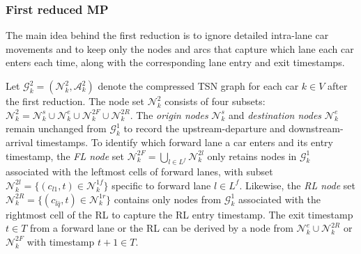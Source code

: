 \documentclass[12pt]{article}
\begin{document}
\subsubsection{First reduced MP}
The main idea behind the first reduction is to ignore detailed intra-lane car movements and to keep only the nodes and arcs that capture which lane each car enters each time, along with the corresponding lane entry and exit timestamps.

Let $\mathcal{G}^2_k=(\mathcal{N}^2_k,\mathcal{A}^2_k)$ denote the compressed TSN graph for each car $k\in V$ after the first reduction. The node set $\mathcal{N}^2_k$ consists of four subsets: $\mathcal{N}^2_k=\mathcal{N}^s_k\cup \mathcal{N}^e_k\cup \mathcal{N}^{2F}_k\cup \mathcal{N}^{2R}_k$. The \textit{origin nodes} $\mathcal{N}^s_k$ and \textit{destination nodes} $\mathcal{N}^e_k$ remain unchanged from $\mathcal{G}^1_k$ to record the upstream-departure and downstream-arrival timestamps. To identify which forward lane a car enters and its entry timestamp, the \textit{FL node} set $\mathcal{N}^{2F}_k=\bigcup_{l\in L^f}{\mathcal{N}^{2l}_k}$ only retains nodes in $\mathcal{G}^1_k$ associated with the leftmost cells of forward lanes, with subset $\mathcal{N}^{2l}_k=\{(c_{l1},t)\in \mathcal{N}^{1f}_k\}$ specific to forward lane $l\in L^f$. Likewise, the \textit{RL node} set $\mathcal{N}^{2R}_k=\{(c_{\bar{l}\bar{q}},t)\in \mathcal{N}^{1r}_k\}$ contains only nodes from $\mathcal{G}^1_k$ associated with the rightmost cell of the RL to capture the RL entry timestamp. The exit timestamp $t\in T$ from a forward lane or the RL can be derived by a node from $\mathcal{N}^e_k\cup \mathcal{N}^{2R}_k$ or $\mathcal{N}^{2F}_k$ with timestamp $t+1\in T$.
\end{document}
